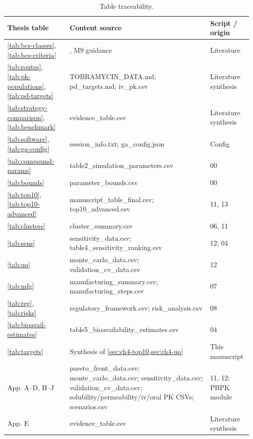 \begin{table}[htbp]
\centering
\caption{Table traceability.}
\label{tab:trace-tabs}
\small
\footnotesize\setlength{\tabcolsep}{4pt}
\begin{tabular}{p{3.4cm}p{8.2cm}p{2.8cm}}
\toprule
Thesis table & Content source & Script / origin\\
\midrule
\ref{tab:bcs-classes}, \ref{tab:bcs-criteria} & \citealt{Amidon1995}, M9 guidance & Literature\\
\ref{tab:routes}, \ref{tab:pk-populations}, \ref{tab:pd-targets} & TOBRAMYCIN\_DATA.md; pd\_targets.md; iv\_pk.csv & Literature synthesis\\
\ref{tab:strategy-comparison}, \ref{tab:benchmark} & evidence\_table.csv & Literature synthesis\\
\ref{tab:software}, \ref{tab:ga-config} & session\_info.txt; ga\_config.json & Config\\
\ref{tab:compound-params} & table2\_simulation\_parameters.csv & 00\\
\ref{tab:bounds} & parameter\_bounds.csv & 00\\
\ref{tab:top10}, \ref{tab:top10-advanced} & manuscript\_table\_final.csv; top10\_advanced.csv & 11, 13\\
\ref{tab:clusters} & cluster\_summary.csv & 06, 11\\
\ref{tab:sens} & sensitivity\_data.csv; table4\_sensitivity\_ranking.csv & 12; 04\\
\ref{tab:uq} & monte\_carlo\_data.csv; validation\_cv\_data.csv & 12\\
\ref{tab:mfg} & manufacturing\_summary.csv; manufacturing\_steps.csv & 07\\
\ref{tab:reg}, \ref{tab:risks} & regulatory\_framework.csv; risk\_analysis.csv & 08\\
\ref{tab:bioavail-estimates} & table5\_bioavailability\_estimates.csv & 04\\
\ref{tab:targets} & Synthesis of \cref{sec:ch4-top10,sec:ch4-uq} & This manuscript\\
App. A--D, H--J & pareto\_front\_data.csv; monte\_carlo\_data.csv; sensitivity\_data.csv; validation\_cv\_data.csv; solubility/permeability/iv/oral PK CSVs; scenarios.csv & 11, 12; PBPK module\\
App. E & evidence\_table.csv & Literature synthesis\\
\bottomrule
\end{tabular}
\end{table}


